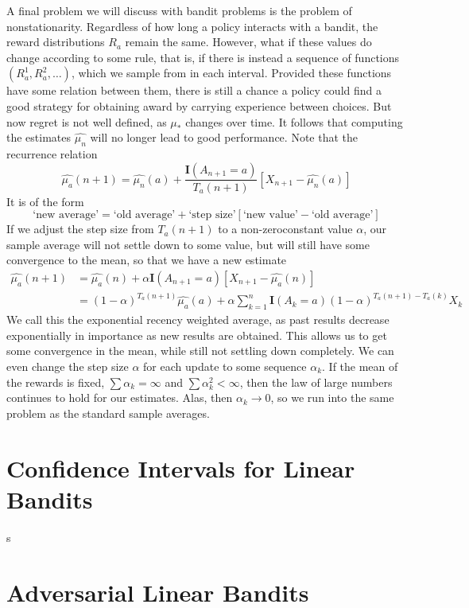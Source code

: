 A final problem we will discuss with bandit problems is the problem of nonstationarity. Regardless of how long a policy interacts with a bandit, the reward distributions $R_a$ remain the same. However, what if these values do change according to some rule, that is, if there is instead a sequence of functions $(R^1_a, R^2_a, \dots)$, which we sample from in each interval. Provided these functions have some relation between them, there is still a chance a policy could find a good strategy for obtaining award by carrying experience between choices. But now regret is not well defined, as $\mu_*$ changes over time. It follows that computing the estimates $\widehat{\mu_n}$ will no longer lead to good performance. Note that the recurrence relation
%
\[ \widehat{\mu_a}(n+1) = \widehat{\mu_n}(a) + \frac{\mathbf{I}(A_{n+1} = a)}{T_a(n+1)} [X_{n+1} - \widehat{\mu_n}(a)] \]
%
It is of the form
%
\[ \text{`new average'} = \text{`old average'} + \text{`step size'}[\text{`new value'} - \text{`old average'}] \]
%
If we adjust the step size from $T_a(n+1)$ to a non-zeroconstant value $\alpha$, our sample average will not settle down to some value, but will still have some convergence to the mean, so that we have a new estimate
%
\begin{align*}
    \widehat{\mu_a}(n+1) &= \widehat{\mu_a}(n) + \alpha \mathbf{I}(A_{n+1} = a) [X_{n+1} - \widehat{\mu_a}(n)]\\
    &= (1 - \alpha)^{T_a(n+1)} \widehat{\mu_a}(a) + \alpha \sum_{k = 1}^n \mathbf{I}(A_k = a) (1 - \alpha)^{T_a(n+1) - T_a(k)} X_k
\end{align*}
%
We call this the exponential recency weighted average, as past results decrease exponentially in importance as new results are obtained. This allows us to get some convergence in the mean, while still not settling down completely. We can even change the step size $\alpha$ for each update to some sequence $\alpha_k$. If the mean of the rewards is fixed, $\sum \alpha_k = \infty$ and $\sum \alpha_k^2 < \infty$, then the law of large numbers continues to hold for our estimates. Alas, then $\alpha_k \to 0$, so we run into the same problem as the standard sample averages.

\section{Confidence Intervals for Linear Bandits}

s

\section{Adversarial Linear Bandits}

